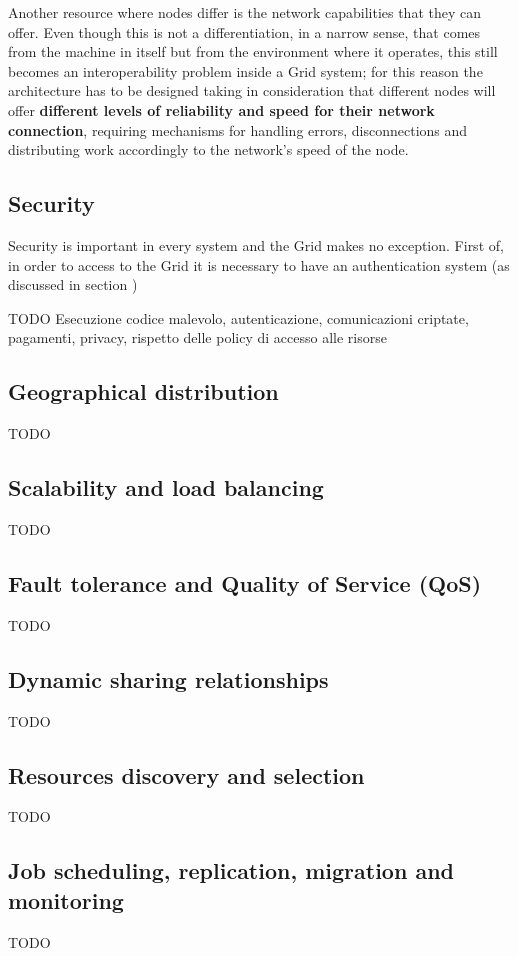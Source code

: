 Another resource where nodes differ is the network capabilities that they can offer. Even though this is not a differentiation, in a narrow sense, that comes from the machine in itself but from the environment where it operates, this still becomes an interoperability problem inside a Grid system; for this reason the architecture has to be designed taking in consideration that different nodes will offer \textbf{different levels of reliability and speed for their network connection}, requiring mechanisms for handling errors, disconnections and distributing work accordingly to the network's speed of the node. 

\subsection{Security}
Security is important in every system and the Grid makes no exception. First of, in order to access to the Grid it is necessary to have an authentication system (as discussed in section )

TODO
Esecuzione codice malevolo, autenticazione, comunicazioni criptate, pagamenti, privacy, rispetto delle policy di accesso alle risorse

\subsection{Geographical distribution}
TODO

\subsection{Scalability and load balancing}
TODO

\subsection{Fault tolerance and Quality of Service (QoS)}
TODO

\subsection{Dynamic sharing relationships}
TODO

\subsection{Resources discovery and selection}
TODO

\subsection{Job scheduling, replication, migration and monitoring}
TODO
